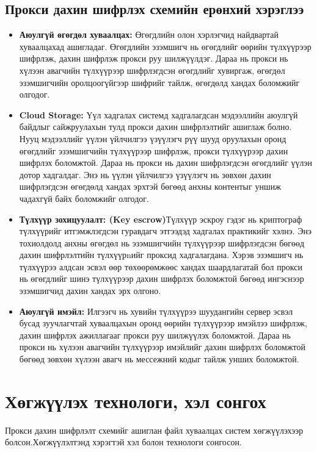 \subsection*{Прокси дахин шифрлэх схемийн ерөнхий хэрэглээ}
\begin{itemize}
    \item \textbf{Аюулгүй өгөгдөл хуваалцах:} Өгөгдлийн олон хэрлэгчид найдвартай хуваалцахад ашигладаг. Өгөгдлийн эзэмшигч нь өгөгдлийг өөрийн түлхүүрээр шифрлэж, дахин шифрлэж прокси руу шилжүүлдэг. Дараа нь прокси нь хүлээн авагчийн түлхүүрээр шифрлэгдсэн өгөгдлийг хувиргаж, өгөгдөл эзэмшигчийн оролцоогүйгээр шифрийг тайлж, өгөгдөлд хандах боломжийг олгодог.

    \item \textbf{Cloud Storage:} Үүл хадгалах системд хадгалагдсан мэдээллийн аюулгүй байдлыг сайжруулахын тулд прокси дахин шифрлэлтийг ашиглаж болно. Нууц мэдээллийг үүлэн үйлчилгээ үзүүлэгч рүү шууд оруулахын оронд өгөгдлийг эзэмшигчийн түлхүүрээр шифрлэж, прокси түлхүүрээр дахин шифрлэх боломжтой. Дараа нь прокси нь дахин шифрлэгдсэн өгөгдлийг үүлэн дотор хадгалдаг. Энэ нь үүлэн үйлчилгээ үзүүлэгч нь зөвхөн дахин шифрлэгдсэн өгөгдөлд хандах эрхтэй бөгөөд анхны контентыг уншиж чадахгүй байх боломжийг олгодог.

    \item \textbf{Түлхүүр зохицуулалт: (Key escrow)}Түлхүүр эскроу гэдэг нь криптограф түлхүүрийг итгэмжлэгдсэн гуравдагч этгээдэд хадгалах практикийг хэлнэ. Энэ тохиолдолд анхны өгөгдөл нь эзэмшигчийн түлхүүрээр шифрлэгдсэн бөгөөд дахин шифрлэлтийн түлхүүрnийг проксид хадгалагдана. Хэрэв эзэмшигч нь түлхүүрээ алдсан эсвэл өөр төхөөрөмжөөс хандах шаардлагатай бол прокси нь өгөгдлийг шинэ түлхүүрээр дахин шифрлэх боломжтой бөгөөд ингэснээр эзэмшигчид дахин хандах эрх олгоно.

    \item \textbf{Аюулгүй имэйл:} Илгээгч нь хувийн түлхүүрээ шуудангийн сервер эсвэл бусад зуучлагчтай хуваалцахын оронд өөрийн түлхүүрээр имэйлээ шифрлэж, дахин шифрлэх ажиллагааг прокси руу шилжүүлэх боломжтой. Дараа нь прокси нь хүлээн авагчийн түлхүүрээр имэйлийг дахин шифрлэх боломжтой бөгөөд зөвхөн хүлээн авагч нь мессежний кодыг тайлж унших боломжтой.
\end{itemize}

\section{Хөгжүүлэх технологи, хэл сонгох}
Прокси дахин шифрлэлт схемийг ашиглан файл хуваалцах систем хөгжүүлэхээр болсон.Хөгжүүлэлтэнд хэрэгтэй хэл болон технологи сонгосон.

